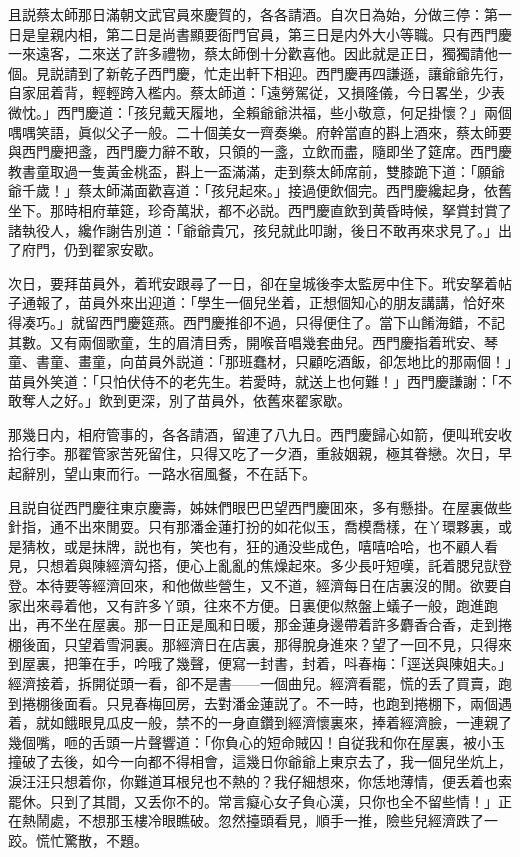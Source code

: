 且説蔡太師那日滿朝文武官員來慶賀的，各各請酒。自次日為始，分做三停：第一日是皇親内相，第二日是尚書顯要衙門官員，第三日是内外大小等職。只有西門慶一來遠客，二來送了許多禮物，蔡太師倒十分歡喜他。因此就是正日，獨獨請他一個。見説請到了新乾子西門慶，忙走出軒下相迎。西門慶再四謙遜，讓爺爺先行，自家屈着背，輕輕跨入檻内。蔡太師道：「遠勞駕従，又損隆儀，今日畧坐，少表微忱。」西門慶道：「孩兒戴天履地，全賴爺爺洪福，些小敬意，何足掛懷？」兩個喁喁笑語，眞似父子一般。二十個美女一齊奏樂。府幹當直的斟上酒來，蔡太師要與西門慶把盞，西門慶力辭不敢，只領的一盞，立飲而盡，隨即坐了筵席。西門慶教書童取過一隻黃金桃盃，斟上一盃滿滿，走到蔡太師席前，雙膝跪下道：「願爺爺千歲！」蔡太師滿面歡喜道：「孩兒起來。」接過便飲個完。西門慶纔起身，依舊坐下。那時相府華筵，珍奇萬狀，都不必説。西門慶直飲到黄昏時候，拏賞封賞了諸執役人，纔作謝告別道：「爺爺貴冗，孩兒就此叩謝，後日不敢再來求見了。」出了府門，仍到翟家安歇。

次日，要拜苗員外，着玳安跟尋了一日，卻在皇城後李太監房中住下。玳安拏着帖子通報了，苗員外來出迎道：「學生一個兒坐着，正想個知心的朋友講講，恰好來得凑巧。」就留西門慶筵燕。西門慶推卻不過，只得便住了。當下山餚海錯，不記其數。又有兩個歌童，生的眉清目秀，開喉音唱幾套曲兒。西門慶指着玳安、琴童、書童、畫童，向苗員外説道：「那班蠢材，只顧吃酒飯，卻怎地比的那兩個！」苗員外笑道：「只怕伏侍不的老先生。若愛時，就送上也何難！」西門慶謙謝：「不敢奪人之好。」飲到更深，別了苗員外，依舊來翟家歇。

那幾日内，相府管事的，各各請酒，留連了八九日。西門慶歸心如箭，便叫玳安收拾行李。那翟管家苦死留住，只得又吃了一夕酒，重敍姻親，極其眷戀。次日，早起辭別，望山東而行。一路水宿風餐，不在話下。

且説自従西門慶往東京慶壽，姊妹們眼巴巴望西門慶囬來，多有懸掛。在屋裏做些針指，通不出來閒耍。只有那潘金蓮打扮的如花似玉，喬模喬樣，在丫環夥裏，或是猜枚，或是抹牌，説也有，笑也有，狂的通没些成色，嘻嘻哈哈，也不顧人看見，只想着與陳經濟勾搭，便心上亂亂的焦燥起來。多少長吁短嘆，託着腮兒獃登登。本待要等經濟回來，和他做些營生，又不道，經濟每日在店裏沒的閒。欲要自家出來尋着他，又有許多丫頭，往來不方便。日裏便似熬盤上蟻子一般，跑進跑出，再不坐在屋裏。那一日正是風和日暖，那金蓮身邊帶着許多麝香合香，走到捲棚後面，只望着雪洞裏。那經濟日在店裏，那得脫身進來？望了一回不見，只得來到屋裏，把筆在手，吟哦了幾聲，便寫一封書，封着，呌春梅：「逕送與陳姐夫。」經濟接着，拆開従頭一看，卻不是書——一個曲兒。經濟看罷，慌的丢了買賣，跑到捲棚後面看。只見春梅回房，去對潘金蓮説了。不一時，也跑到捲棚下，兩個遇着，就如餓眼見瓜皮一般，禁不的一身直鑽到經濟懷裏來，捧着經濟臉，一連親了幾個嘴，咂的舌頭一片聲響道：「你負心的短命賊囚！自従我和你在屋裏，被小玉撞破了去後，如今一向都不得相會，這幾日你爺爺上東京去了，我一個兒坐炕上，淚汪汪只想着你，你難道耳根兒也不熱的？我仔細想來，你恁地薄情，便丢着也索罷休。只到了其間，又丢你不的。常言癡心女子負心漢，只你也全不留些情！」正在熱鬧處，不想那玉樓冷眼瞧破。忽然擡頭看見，順手一推，險些兒經濟跌了一跤。慌忙驚散，不題。

